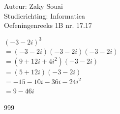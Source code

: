 \documentclass[a4paper]{article}
\begin{document}
  
\noindent \large Auteur: Zaky Souai \\
\noindent \large Studierichting:  Informatica\\
\noindent \large Oefeningenreeks 1B nr. 17.17\\

\bigskip

\normalsize

$(-3-2i)^3$\\

$=(-3-2i)(-3-2i)(-3-2i)$\\

$= (9 + 12i + 4i^2) (- 3 - 2i)$\\

$=(5 + 12 i)(- 3 - 2i)$\\

$=- 15 - 10i - 36i - 24i^2$\\

$=9 - 46i$





\begin{thebibliography}{999}
\end{thebibliography}
\end{document}
